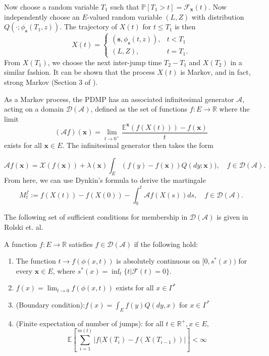Now choose a random variable $T_1$ such that $\mathbb{P}[T_1>t] = \mathcal F_\mathbf x(t)$.  Now independently choose an $E$-valued random variable $(L,Z)$ with distribution $Q(\cdot ; \phi_\mathbf s(T_1,z))$.  The trajectory of $X(t)$ for $t \le T_1$ is then
\begin{equation}
X(t) = \begin{cases} (\mathbf s,\phi_\mathbf s(t,z)), & t<T_1 \\
(L,Z), & t = T_1.
\end{cases}
\end{equation}
From $X(T_1)$, we choose the next inter-jump time $T_2-T_1$ and $X(T_2)$ in a similar fashion. It can be shown that the process $X(t)$ is Markov, and in fact, strong Markov (Section 3 of \cite{dav84}).  

As a Markov process, the PDMP has an associated infinitesimal generator $\mathcal A$, acting on a domain $\mathcal D(\mathcal A)$, defined as the set of functions $f:E\rightarrow \mathbb R$ where the limit 
\begin{equation}
 (\mathcal Af)(\mathbf x)=  \lim_{t\rightarrow 0^+} \frac{\mathbb E^\mathbf x (f(X(t)))-f(\mathbf x)}{t}
\end{equation}
exists for all $\mathbf x \in E$. The infinitesimal generator then takes the form

\begin{equation}\label{generator}
\mathcal Af(\mathbf x) = \mathcal X(f(\mathbf x))   +\lambda(\mathbf x)\int_E (f(y)-f(\mathbf x))Q(dy;\mathbf x)), \quad f \in \mathcal D(\mathcal A).
\end{equation}
From here, we can use Dynkin's formula to derive the  
martingale
\begin{equation}\label{martingale}
M_t^f := f(X(t)) - f(X(0))-\int_0^t \mathcal A f(X(s))ds,\quad f \in \mathcal D(\mathcal A).
\end{equation}

The following set of sufficient conditions for membership in $\mathcal D(\mathcal A)$ is given in Rolski et. al. \cite{rolski2009stochastic}
\begin{theorem}\label{fourcond} A function $f: E \rightarrow \mathbb{R}$ satisfies $f \in \mathcal D(\mathcal A)$ if the following hold:
  
\begin{enumerate}
\item 
The function $t \rightarrow f(\phi(x,t))$ is absolutely continuous on $[0,s^*(x))$ for every $\mathbf x \in E$, where $s^*(x) = \inf_t\{t|\mathcal F(t) =0\}$. \item
$f(x)  = \lim_{t \rightarrow 0} f(\phi(x,t))$ exists for all $x \in  \Gamma^*$ \item
(Boundary condition):$f(x)= \int_E f(y) Q(dy,x)$ for $x \in \Gamma^*$\item
(Finite expectation of number of jumps): for all $t \in \mathbb{R}^+, x\in E$,
\begin{equation} 
\mathbb{E}\left[\sum_{i = 1}^{m(t)} |f(X(T_i)-f(X(T_{i-1}))|\right]<\infty
\end{equation}
\end{enumerate}
\end{theorem}

